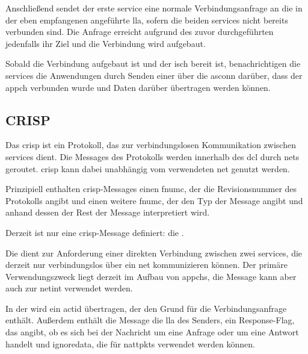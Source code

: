 Anschließend sendet der erste \gls{service} eine normale Verbindungsanfrage an
die in der eben empfangenen \msg{\crispneighreq} angeführte \gls{lla}, sofern
die beiden \glspl{service} nicht bereits verbunden sind.
Die Anfrage erreicht aufgrund des zuvor durchgeführten
 jedenfalls ihr Ziel und die Verbindung wird
aufgebaut.

Sobald die Verbindung aufgebaut ist und der \gls{isch} bereit ist,
benachrichtigen die \glspl{service} die Anwendungen durch Senden einer
\msg{\asprotoappchconnected} über die \gls{asconn} darüber, dass der \gls{appch}
verbunden wurde und Daten darüber übertragen werden können.

\subsection{CRISP}
\label{dcl-crisp}
Das \acrfull{crisp} ist ein Protokoll, das zur verbindungslosen Kommunikation
zwischen \glspl{service} dient.
Die Messages des Protokolls werden innerhalb des \gls{dcl} durch \glspl{net}
geroutet.
\acrshort{crisp} kann dabei unabhängig vom verwendeten \gls{net} genutzt werden.

Prinzipiell enthalten \acrshort{crisp}-Messages einen \gls{fnumc}, der die
Revisionsnummer des Protokolls angibt und einen weitere \gls{fnumc}, der den
Typ der Message angibt und anhand dessen der Rest der Message interpretiert
wird.

\crispbytefield

\label{dcl-crisp-neighreq}
Derzeit ist nur eine \acrshort{crisp}-Message definiert: die
\msg{\crispneighreq}.

Die \msg{\crispneighreq} dient zur Anforderung einer direkten Verbindung
zwischen zwei \glspl{service}, die derzeit nur verbindungslos über ein \gls{net}
kommunizieren können. Der primäre Verwendungszweck liegt derzeit im Aufbau von
\glspl{appch}, die Message kann aber auch zur \gls{netint} verwendet werden.

In der \msg{\crispneighreq} wird ein \gls{actid} übertragen, der den Grund für
die Verbindungsanfrage enthält.
Außerdem enthält die Message die \gls{lla} des Senders, ein Response-Flag,
das angibt, ob es sich bei der Nachricht um eine Anfrage oder um eine Antwort
handelt und \gls{ignoredata}, die für \glspl{nattpkt} verwendet werden können.

\crispneighreqbytefield


